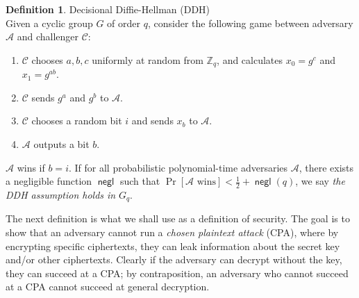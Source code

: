 \documentclass[11pt,twoside,a4paper]{article}
\DeclareMathOperator{\negl}{\mathsf{negl}}
\theoremstyle{definition}
\newtheorem{definition}{Definition}[section]
\begin{document}
\begin{definition}{Decisional Diffie-Hellman (DDH)}\\
    Given a cyclic group \(G\) of order \(q\), consider the following game between adversary \(\mathcal{A}\) and challenger \(\mathcal{C}\):
    \begin{enumerate}
        \item \(\mathcal{C}\) chooses \(a, b, c\) uniformly at random from \(\mathbb{Z}_q\), and calculates \(x_0=g^c\) and \(x_1=g^{ab}\).
        \item \(\mathcal{C}\) sends \(g^a\) and \(g^b\) to \(\mathcal{A}\).
        \item \(\mathcal{C}\) chooses a random bit \(i\) and sends \(x_b\) to \(\mathcal{A}\).
        \item \(\mathcal{A}\) outputs a bit \(b\).
    \end{enumerate}
    \(\mathcal{A}\) wins if \(b = i\). If for all probabilistic polynomial-time adversaries \(\mathcal{A}\), there exists a negligible function \(\negl\) such that \(\Pr[\mathcal{A}\text{ wins}]<\frac{1}{2}+\negl(q)\), we say \textit{the DDH assumption holds in} \(G_q\).
\end{definition}
The next definition is what we shall use as a definition of security. The goal is to show that an adversary cannot run a \textit{chosen plaintext attack} (CPA), where by encrypting specific ciphertexts, they can leak information about the secret key and/or other ciphertexts. Clearly if the adversary can decrypt without the key, they can succeed at a CPA; by contraposition, an adversary who cannot succeed at a CPA cannot succeed at general decryption.
\end{document}
